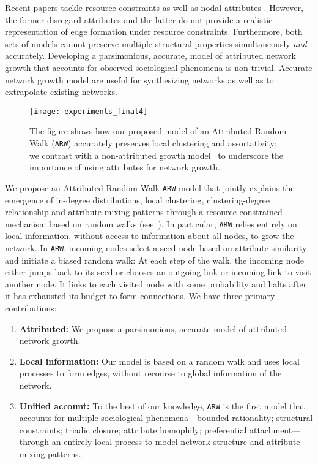 Recent papers tackle resource constraints \cite{mossa2002truncation,zeng2005construction,wang2009local} as well as nodal attributes
\cite{de2013scale,gong2012evolution}. However, the former disregard attributes and the latter do not provide a realistic representation
of edge formation under resource constraints. Furthermore, both sets of models cannot preserve multiple structural properties
simultaneously \textit{and} accurately. Developing a parsimonious,
accurate, model of attributed network growth that accounts for observed
sociological phenomena is non-trivial. Accurate network growth model are useful
for synthesizing networks as well as to extrapolate existing networks.




\begin{figure}[t]
	\centering
	\texttt{[image: experiments\_final4]}
	\caption{The figure shows how our proposed model of an Attributed Random Walk (\texttt{ARW}) accurately preserves local clustering and assortativity; we contrast with a non-attributed growth model~\cite{holme2002growing} to underscore the importance of using attributes for network growth.}
	\label{fig:intro_plot}
\end{figure}


We propose an Attributed Random Walk \texttt{ARW} model that jointly explains
the emergence of in-degree distributions, local clustering, clustering-degree
relationship and attribute mixing patterns through a resource constrained mechanism based on random walks (see~). In particular, \texttt{ARW} relies entirely on local information, without access to information about all nodes, to grow the network. In \texttt{ARW}, incoming nodes select a seed node based on attribute similarity and initiate a biased random walk: At each step of the walk, the incoming node either jumps back to its seed or chooses an outgoing link or incoming link to visit another node. It links to each visited node with some probability and halts after it has exhausted its budget to form connections. We have three primary contributions:
\begin{enumerate}
\item \textbf{Attributed:} We propose a parsimonious, accurate model of attributed network growth.
\item \textbf{Local information:} Our model is based on a random walk and uses local processes to form edges, without recourse to global information of the network.
\item \textbf{Unified account:} To the best of our knowledge, \texttt{ARW} is the first model that accounts for multiple sociological phenomena---bounded rationality; structural constraints; triadic closure; attribute homophily; preferential attachment---through an entirely local process to model network structure and attribute mixing patterns.
\end{enumerate}



